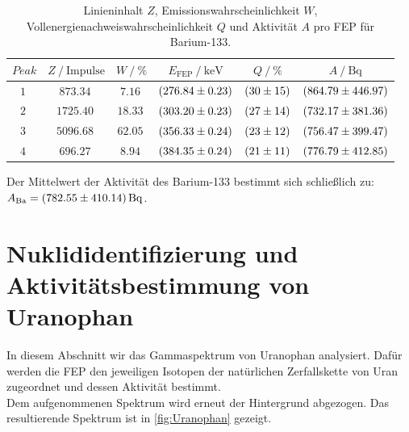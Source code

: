 \begin{table}
    \centering
    \caption{Linieninhalt $Z$, Emissionswahrscheinlichkeit $W$, Vollenergienachweiswahrscheinlichkeit $Q$ und Aktivität $A$ pro FEP für Barium-133\cite{Gammaspektrum_Ba133}.}
    \label{tab:Barium}
    \begin{tabular}{c c c c c c}
      \toprule
      $Peak$ & $Z \mathbin{/} \mathrm{Impulse}$ & $W \mathbin{/} \% $ & $E_{\mathrm{FEP}} \mathbin{/} \unit{\kilo\electronvolt}$ & $Q \mathbin{/} \%$ & $A \mathbin{/} \unit{\becquerel}$ \\
      \midrule
      $\qty{1}{} $ & $\qty{873.34}{}$ & $\qty{7.16}{}$  & $\qty{276.84 \pm 0.23}{}$ & $\qty{30 \pm 15}{}$ & $\qty{864.79 \pm 446.97}{}$ \\
      $\qty{2}{}$ & $\qty{1725.40}{}$ & $\qty{18.33}{}$ & $\qty{303.20 \pm 0.23}{}$ & $\qty{27 \pm 14}{}$ & $\qty{732.17 \pm 381.36}{}$ \\
      $\qty{3}{}$ & $\qty{5096.68}{}$ & $\qty{62.05}{}$ & $\qty{356.33 \pm 0.24}{}$ & $\qty{23 \pm 12}{}$ & $\qty{756.47 \pm 399.47}{}$ \\
      $\qty{4}{}$ & $\qty{696.27}{}$  & $\qty{8.94}{}$  & $\qty{384.35 \pm 0.24}{}$ & $\qty{21 \pm 11}{}$ & $\qty{776.79 \pm 412.85}{}$ \\
      \bottomrule
    \end{tabular}
\end{table}

Der Mittelwert der Aktivität des Barium-133 bestimmt sich schließlich zu: $A_{\mathrm{Ba}} = \qty{782.55 \pm 410.14}{\becquerel}$.

\section{Nuklididentifizierung und Aktivitätsbestimmung von Uranophan}

In diesem Abschnitt wir das Gammaspektrum von Uranophan analysiert. Dafür werden die FEP den jeweiligen Isotopen der natürlichen Zerfallskette von Uran zugeordnet und dessen Aktivität bestimmt.\\
Dem aufgenommenen Spektrum wird erneut der Hintergrund abgezogen. Das resultierende Spektrum ist in \autoref{fig:Uranophan} gezeigt.

